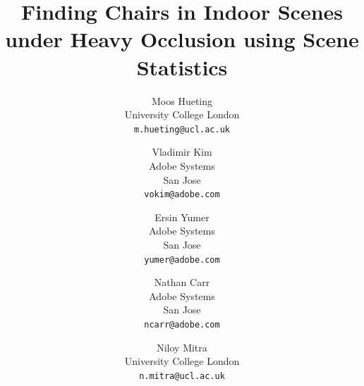 \documentclass[10pt,twocolumn,letterpaper]{article}
\begin{document}
\title{Finding Chairs in Indoor Scenes under Heavy Occlusion using Scene Statistics}

\author{Moos Hueting\\
University College London\\
{\tt\small m.hueting@ucl.ac.uk}
\and
Vladimir Kim\\
Adobe Systems\\
San Jose\\
{\tt\small vokim@adobe.com}
\and
Ersin Yumer\\
Adobe Systems\\
San Jose\\
{\tt\small yumer@adobe.com}
\and
Nathan Carr\\
Adobe Systems\\
San Jose\\
{\tt\small ncarr@adobe.com}
\and
Niloy Mitra\\
University College London\\
{\tt\small n.mitra@ucl.ac.uk}
}

\maketitle
\end{document}
